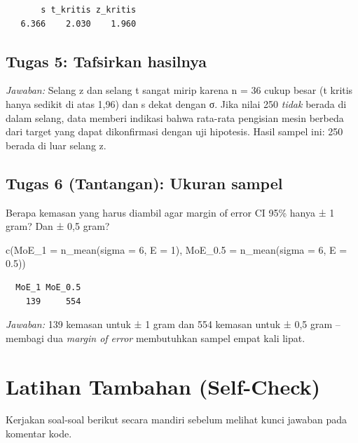 \documentclass[
  indonesian,
  letterpaper,
]{book}
\newenvironment{Shaded}{\begin{snugshade}}{\end{snugshade}}
\newcommand{\AttributeTok}[1]{\textcolor[rgb]{0.40,0.45,0.13}{#1}}
\newcommand{\DecValTok}[1]{\textcolor[rgb]{0.68,0.00,0.00}{#1}}
\newcommand{\FloatTok}[1]{\textcolor[rgb]{0.68,0.00,0.00}{#1}}
\newcommand{\FunctionTok}[1]{\textcolor[rgb]{0.28,0.35,0.67}{#1}}
\newcommand{\NormalTok}[1]{\textcolor[rgb]{0.00,0.23,0.31}{#1}}
\begin{document}
\begin{verbatim}
       s t_kritis z_kritis 
   6.366    2.030    1.960 
\end{verbatim}

\subsection{Tugas 5: Tafsirkan
hasilnya}\label{tugas-5-tafsirkan-hasilnya}

\emph{Jawaban:} Selang z dan selang t sangat mirip karena n = 36 cukup
besar (t kritis hanya sedikit di atas 1,96) dan s dekat dengan σ. Jika
nilai 250 \emph{tidak} berada di dalam selang, data memberi indikasi
bahwa rata-rata pengisian mesin berbeda dari target yang dapat
dikonfirmasi dengan uji hipotesis. Hasil sampel ini: 250 berada di luar
selang z.

\subsection{Tugas 6 (Tantangan): Ukuran
sampel}\label{tugas-6-tantangan-ukuran-sampel}

Berapa kemasan yang harus diambil agar margin of error CI 95\% hanya ± 1
gram? Dan ± 0,5 gram?

\begin{Shaded}
\begin{Highlighting}[]
\FunctionTok{c}\NormalTok{(}\AttributeTok{MoE\_1 =} \FunctionTok{n\_mean}\NormalTok{(}\AttributeTok{sigma =} \DecValTok{6}\NormalTok{, }\AttributeTok{E =} \DecValTok{1}\NormalTok{), }\AttributeTok{MoE\_0.5 =} \FunctionTok{n\_mean}\NormalTok{(}\AttributeTok{sigma =} \DecValTok{6}\NormalTok{, }\AttributeTok{E =} \FloatTok{0.5}\NormalTok{))}
\end{Highlighting}
\end{Shaded}

\begin{verbatim}
  MoE_1 MoE_0.5 
    139     554 
\end{verbatim}

\emph{Jawaban:} 139 kemasan untuk ± 1 gram dan 554 kemasan untuk ± 0,5
gram -- membagi dua \emph{margin of error} membutuhkan sampel empat kali
lipat.

\section{Latihan Tambahan
(Self-Check)}\label{latihan-tambahan-self-check}

Kerjakan soal-soal berikut secara mandiri sebelum melihat kunci jawaban
pada komentar kode.
\end{document}
